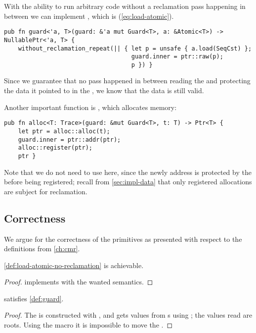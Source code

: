 With the ability to run arbitrary code without a reclamation pass happening in between we can
implement , which is  (\cref{eq:load-atomic}).
\begin{lstlisting}[style=Rust]
pub fn guard<'a, T>(guard: &'a mut Guard<T>, a: &Atomic<T>) -> NullablePtr<'a, T> {
    without_reclamation_repeat(|| { let p = unsafe { a.load(SeqCst) };
                                    guard.inner = ptr::raw(p);
                                    p }) }
\end{lstlisting}
Since we guarantee that no pass happened in between reading the  and protecting the
data it pointed to in the , we know that the data is still valid.


Another important function is , which allocates memory:
\begin{lstlisting}[style=Rust]
pub fn alloc<T: Trace>(guard: &mut Guard<T>, t: T) -> Ptr<T> {
    let ptr = alloc::alloc(t);
    guard.inner = ptr::addr(ptr);
    alloc::register(ptr);
    ptr }
\end{lstlisting}
Note that we do not need to use  here, since the newly address is
protected by the  before being registered; recall from \cref{sec:impl-data} that only
registered allocations are subject for reclamation.




\subsection{Correctness}

We argue for the correctness of the primitives as presented with respect to the definitions from
\cref{ch:cmr}.


\begin{claim}
  \cref{def:load-atomic-no-reclamation} is achievable.
\end{claim}
\begin{proof}
   implements  with the wanted semantics.
\end{proof}

\begin{claim}
   satisfies \cref{def:guard}.
\end{claim}
\begin{proof}
  The  is constructed with , and gets values from s using
  ; the values read are roots.
  Using the  macro it is impossible to move the .
\end{proof}

